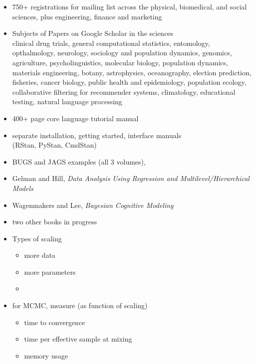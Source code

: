 \documentclass[10pt]{report}
\newcommand{\sld}[1]{\newpage{\noindent\LARGE \ \ \
    \textcolor{MidnightBlue}{\bfseries #1}}\vspace*{4pt}}
\newcommand{\myemph}[1]{{\color{MidnightBlue}{\bfseries #1}}}
\begin{document}
\sld{Who's Using Stan?}
\begin{itemize}
\item 750+ registrations for mailing list across the physical,
biomedical, and social sciences, plus engineering, finance and marketing

\item Subjects of Papers on Google Scholar in the sciences
\\
{\footnotesize clinical drug
trials, general computational statistics, entomology, opthalmology,
neurology, sociology and population dynamics, genomics, agriculture,
psycholinguistics, molecular biology, population dynamics, materials
engineering, botany, astrophysics, oceanography, election prediction,
fisheries, cancer biology, public health and epidemiology, population
ecology, collaborative filtering for recommender systems, climatology,
educational testing, natural language processing}
\end{itemize}

\sld{Books and Model Sets}
%
\begin{itemize}
\item 400+ page core language tutorial manual
\item separate installation, getting started, interface manuals 
\\ {\footnotesize  (RStan, PyStan, CmdStan)}
\item BUGS and JAGS examples (all 3 volumes), 
\item Gelman and Hill, {\slshape Data Analysis Using Regression and
    Multilevel/Hierarchical Models}
\item Wagenmakers and Lee, {\slshape Bayesian Cognitive Modeling}
\item two other books in progress
\end{itemize}

\sld{Scaling and Evaluation}
\begin{itemize}
\item Types of scaling
\vspace*{-4pt}
\begin{itemize}\small
\item more data
\item more parameters
\item \myemph{more complex models}
\end{itemize}
\item for MCMC, measure (as function of scaling)
\vspace*{-4pt}
\begin{itemize}\small
\item time to convergence
\item time per effective sample at mixing
\item memory usage
\end{itemize}
\end{itemize}
\end{document}
